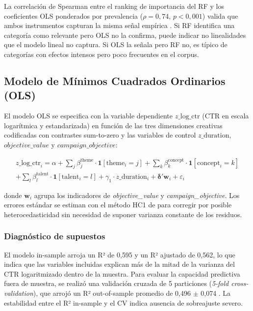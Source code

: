 \documentclass[12pt, a4paper]{report}
\begin{document}
La correlación de Spearman entre el ranking de importancia del RF y los coeficientes OLS
ponderados por prevalencia ($\rho = 0{,}74$, $p < 0{,}001$) valida que ambos instrumentos
capturan la misma señal empírica \citep{breiman2001b}. Si RF identifica una categoría como
relevante pero OLS no la confirma, puede indicar no linealidades que el modelo lineal no
captura. Si OLS la señala pero RF no, es típico de categorías con efectos intensos pero
poco frecuentes en el corpus.

\subsection{Modelo de Mínimos Cuadrados Ordinarios (OLS)}

El modelo OLS se especifica con la variable dependiente $z\_\text{log\_ctr}$ (CTR en escala
logarítmica y estandarizada) en función de las tres dimensiones creativas codificadas con
contrastes sum-to-zero y las variables de control $z\_\text{duration}$,
$\textit{objective\_value}$ y $\textit{campaign\_objective}$:

\begin{multline}
  z\_\text{log\_ctr}_i = \alpha
    + \sum_{j} \beta_j^{\text{theme}} \cdot \mathbf{1}[\text{theme}_i = j]
    + \sum_{k} \beta_k^{\text{concept}} \cdot \mathbf{1}[\text{concept}_i = k] \\
    + \sum_{l} \beta_l^{\text{talent}} \cdot \mathbf{1}[\text{talent}_i = l]
    + \gamma_1 \cdot z\_\text{duration}_i
    + \boldsymbol{\delta}' \mathbf{w}_i
    + \varepsilon_i
\end{multline}

donde $\mathbf{w}_i$ agrupa los indicadores de \textit{objective\_value} y
\textit{campaign\_objective}. Los errores estándar se estiman con el método HC1 de
\citet{white1980} para corregir por posible heterocedasticidad sin necesidad de suponer
varianza constante de los residuos.

\subsubsection*{Diagnóstico de supuestos}

El modelo in-sample arroja un R² de 0{,}595 y un R² ajustado de 0{,}562, lo que indica que
las variables incluidas explican más de la mitad de la varianza del CTR logaritmizado dentro
de la muestra. Para evaluar la capacidad predictiva fuera de muestra, se realizó una
validación cruzada de 5 particiones (\textit{5-fold cross-validation}), que arrojó un R²
out-of-sample promedio de 0{,}496 $\pm$ 0{,}074 \citep{breiman2001}. La estabilidad entre el R² in-sample y el
CV indica ausencia de sobreajuste severo.
\end{document}
